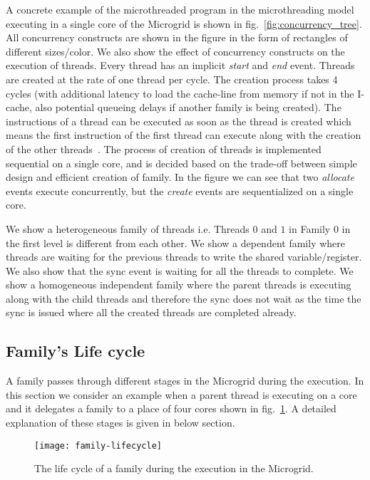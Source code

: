 \documentclass{article}
\begin{document}
A concrete example of the microthreaded program in the microthreading model
executing in a single core of the Microgrid is shown
in fig.~\ref{fig:concurrency_tree}. All concurrency constructs are shown in the
figure in the form of rectangles of different sizes/color. We also show the
effect of concurrency constructs on the execution of threads. Every thread has
an implicit \emph{start} and \emph{end} event. Threads are created at the rate
of one thread per cycle. The creation process takes 4 cycles (with additional
latency to load the cache-line from memory if not in the I-cache, also
potential queueing delays if another family is being created). The instructions
of a thread can be executed as soon as the thread is created which means the
first instruction of the first thread can execute along with the creation of
the other threads~\cite{mike.12}. The process of creation of threads is
implemented sequential on a single core, and is decided based on the trade-off
between simple design and efficient creation of family. In the figure we can
see that two \emph{allocate} events execute concurrently, but the \emph{create}
events are sequentialized on a single core.

We show a heterogeneous family of threads i.e. Threads $0$ and $1$ in Family
$0$ in the first level is different from each other. We show a dependent family
where threads are waiting for the previous threads to write the shared
variable/register. We also show that the sync event is waiting for all the
threads to complete. We show a homogeneous independent family where the parent
threads is executing along with the child threads and therefore the sync does
not wait as the time the sync is issued where all the created threads are
completed already.

\subsection{Family's Life cycle}\label{sn:family_lifecycle}

A family passes through different stages in the Microgrid during the execution.
In this section we consider an example when a parent thread is executing on a
core and it delegates a family to a place of four cores shown
in fig.~\ref{fig:family_lifecycle}. A detailed explanation of these stages is
given in below section. 

\begin{figure}

\begin{centering}

\texttt{[image: family-lifecycle]}

\caption{\label{fig:family_lifecycle}The life cycle of a family during the
execution in the Microgrid.}

\end{centering}

\end{figure}
\end{document}
